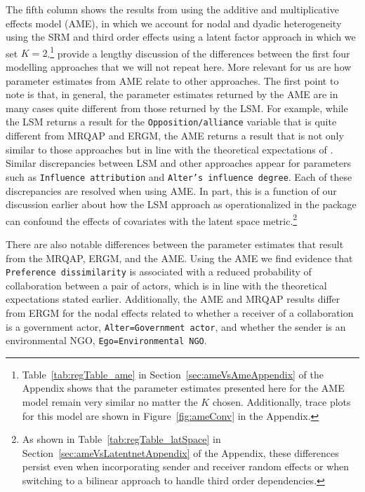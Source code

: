 The fifth column shows the results from using the additive and multiplicative effects model (AME), in which we account for nodal and dyadic heterogeneity using the SRM and third order effects using a latent factor approach in which we set $K=2$.\footnote{Table~\ref{tab:regTable_ame} in Section~\ref{sec:ameVsAmeAppendix} of the Appendix shows that the parameter estimates presented here for the AME model remain very similar no matter the $K$ chosen. Additionally, trace plots for this model are shown in Figure~\ref{fig:ameConv} in the Appendix.} \citet{cranmer:etal:2016} provide a lengthy discussion of the differences between the first four modelling approaches that we will not repeat here. More relevant for us are how parameter estimates from AME relate to other approaches. The first point to note is that, in general, the parameter estimates returned by the AME are in many cases quite different from those returned by the LSM. For example, while the LSM returns a result for the \texttt{Opposition/alliance} variable that is quite different from MRQAP and ERGM, the AME returns a result that is not only similar to those approaches but in line with the theoretical expectations of \citet{ingold:fischer:2014}. Similar discrepancies between LSM and other approaches appear for parameters such as \texttt{Influence attribution} and \texttt{Alter's influence degree}. Each of these discrepancies are resolved when using AME. In part, this is a function of our discussion earlier about how the LSM approach as operationalized in the  package can confound the effects of covariates with the latent space metric.\footnote{As shown in Table~\ref{tab:regTable_latSpace} in Section~\ref{sec:ameVsLatentnetAppendix} of the Appendix, these differences persist even when incorporating sender and receiver random effects or when switching to a bilinear approach to handle third order dependencies.}


\FloatBarrier

There are also notable differences between the parameter estimates that result from the MRQAP, ERGM, and the AME. Using the AME we find evidence that \texttt{Preference dissimilarity} is associated with a reduced probability of collaboration between a pair of actors, which is in line with the theoretical expectations stated earlier. Additionally, the AME and MRQAP results differ from ERGM for the nodal effects related to whether a receiver of a collaboration is a government actor, \texttt{Alter=Government actor}, and whether the sender is an environmental NGO, \texttt{Ego=Environmental NGO}.

